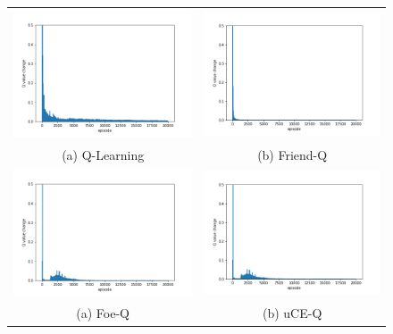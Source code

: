\documentclass[conference]{IEEEtran}
\begin{document}
\begin{figure}
	\begin{tabular}{cc}
		\includegraphics[width=3.4in]{figures/Q.png} &
		\includegraphics[width=3.4in]{figures/friendQ.png} \\
		(a) Q-Learning & (b) Friend-Q \\
		\includegraphics[width=3.4in]{figures/foeQ.png} &
		\includegraphics[width=3.4in]{figures/ceQ.png} \\
		(a) Foe-Q & (b) uCE-Q \\
	\end{tabular}
	\caption{}
	\label{fig:results}
\end{figure}

	


\end{document}
